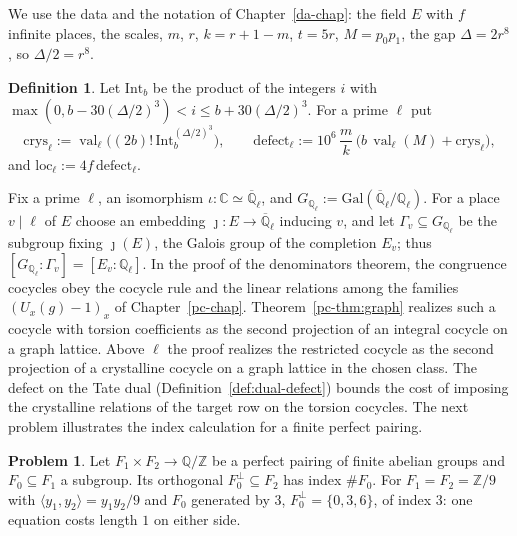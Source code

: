 \documentclass[reqno]{amsart}
\newcounter{chap}
\theoremstyle{definition}
\newtheorem{problem}{Problem}[section]
\newtheorem{definition}{Definition}[section]
\theoremstyle{plain}
\newcommand{\Z}{\mathbb{Z}}
\newcommand{\Q}{\mathbb{Q}}
\newcommand{\C}{\mathbb{C}}
\newcommand{\val}{\operatorname{val}}
\newcommand{\loc}{\mathrm{loc}}
\newcommand{\defect}{\mathrm{defect}}
\newcommand{\crys}{\mathrm{crys}}
\newcommand{\Int}{\mathrm{Int}}
\newcommand{\Gl}{G_{\Q_\ell}}
\newcommand{\half}{(\Delta/2)}
\begin{document}
We use the data and the notation of Chapter~\ref{da-chap}: the field \(E\) with \(f\) infinite places, the scales, \(m\), \(r\), \(k = r + 1 - m\), \(t = 5r\), \(M = p_0p_1\), the gap \(\Delta = 2r^8\), so \(\Delta/2 = r^8\).

\begin{definition}\label{def:loss}
Let \(\Int_b\) be the product of the integers \(i\) with \(\max(0, b - 30\half^3) < i \le b + 30\half^3\).  For a prime \(\ell\) put
\[
  \crys_\ell := \val_\ell\bigl((2b)!\,\Int_b^{\half^3}\bigr), \qquad
  \defect_\ell := 10^6\,\frac mk\,\bigl(b\,\val_\ell(M) + \crys_\ell\bigr),
\]
and \(\loc_\ell := 4f\,\defect_\ell\).
\end{definition}

Fix a prime \(\ell\), an isomorphism \(\iota\colon \C \simeq \overline{\Q}_\ell\), and \(\Gl := \mathrm{Gal}(\overline{\Q}_\ell/\Q_\ell)\).  For a place \(v \mid \ell\) of \(E\) choose an embedding \(\jmath\colon E \to \overline{\Q}_\ell\) inducing \(v\), and let \(\Gamma_v \subseteq \Gl\) be the subgroup fixing \(\jmath(E)\), the Galois group of the completion \(E_v\); thus \([\Gl : \Gamma_v] = [E_v : \Q_\ell]\).  In the proof of the denominators theorem, the congruence cocycles obey the cocycle rule and the linear relations among the families \((U_x(g)-1)_x\) of Chapter~\ref{pc-chap}.  Theorem~\ref{pc-thm:graph} realizes such a cocycle with torsion coefficients as the second projection of an integral cocycle on a graph lattice.  Above \(\ell\) the proof realizes the restricted cocycle as the second projection of a crystalline cocycle on a graph lattice in the chosen class.  The defect on the Tate dual (Definition~\ref{def:dual-defect}) bounds the cost of imposing the crystalline relations of the target row on the torsion cocycles.  The next problem illustrates the index calculation for a finite perfect pairing.

\begin{problem}\label{pr:pairing-model}
Let \(F_1 \times F_2 \to \Q/\Z\) be a perfect pairing of finite abelian groups and \(F_0 \subseteq F_1\) a subgroup.  Its orthogonal \(F_0^\perp \subseteq F_2\) has index \(\#F_0\).  For \(F_1 = F_2 = \Z/9\) with \(\langle y_1, y_2\rangle = y_1y_2/9\) and \(F_0\) generated by \(3\), \(F_0^\perp = \{0, 3, 6\}\), of index \(3\): one equation costs length \(1\) on either side.
\end{problem}
\end{document}
